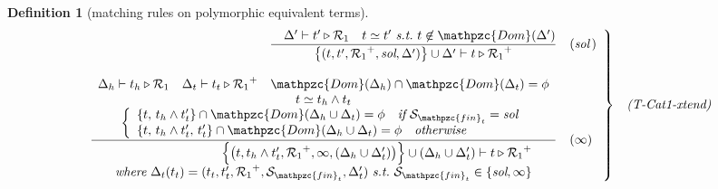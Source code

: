 \documentclass[12pt]{article}
\newtheorem{Definition}{Definition}[section]
\begin{document}
\begin{Definition}[matching rules on polymorphic equivalent terms]
\begin{displaymath}
\begin{array}{c}
      \begin{array}{rl}
        \left. \begin{array}{rl}
          \dfrac{
            \quad \Delta' \vdash t' \triangleright \mathcal{R}_1 \quad
             t \simeq t'\ \text{\it s.t.}\ t \not\in \mathpzc{Dom}(\Delta')
          }{
            \bigl\{(t, t', {\mathcal{R}_1}^+, \text{\it sol}, \Delta')
             \bigr\} \cup \Delta' \vdash
              t \triangleright {\mathcal{R}_1}^+
          }  &  (\text{\it sol}\,)  \\
          \\
          \dfrac{
            \begin{array}{c}
              \Delta_h \vdash t_h \triangleright \mathcal{R}_1
               \quad \Delta_t \vdash t_t \triangleright {\mathcal{R}_1}^+
                \quad \mathpzc{Dom}(\Delta_h) \cap \mathpzc{Dom}(\Delta_t)
                 = \phi  \\
              t \simeq t_h \wedge t_t  \\
              \left\{\begin{array}{l}
                \{t,\, t_h \wedge t'_t \} \cap \mathpzc{Dom}(
                 \Delta_h \cup \Delta_t) = \phi\quad \text{\it if}\
                  \mathcal{S}_{\mathpzc{fin}_t} = \text{\it sol}  \\
                \{t,\, t_h \wedge t'_t,\, t'_t \} \cap \mathpzc{Dom}(
                 \Delta_h \cup \Delta_t) = \phi\quad \text{\it otherwise}
              \end{array}\right.
            \end{array}
          }{
            \begin{array}{r}
              \Bigl\{\bigl(t, t_h \wedge t_t', {\mathcal{R}_1}^+, \infty,
               (\Delta_h \cup \Delta_t') \bigr) \Bigr\} \cup
                (\Delta_h \cup \Delta_t') \vdash
                 t \triangleright {\mathcal{R}_1}^+  \\
              \text{\it where}\
               \Delta_t(t_t) = (t_t, t_t', {\mathcal{R}_1}^+,
                \mathcal{S}_{\mathpzc{fin}_t}, \Delta_t')\ \text{\it s.t.}\
                 \mathcal{S}_{\mathpzc{fin}_t} \in \{\text{\it sol}, \infty\}
            \end{array}
          }  &  (\infty)
        \end{array} \right\}  &  \text{\it (T-Cat1-xtend)}
      \end{array}  \\
      \\
      

\end{array}
\end{displaymath}
\end{Definition}
\end{document}
